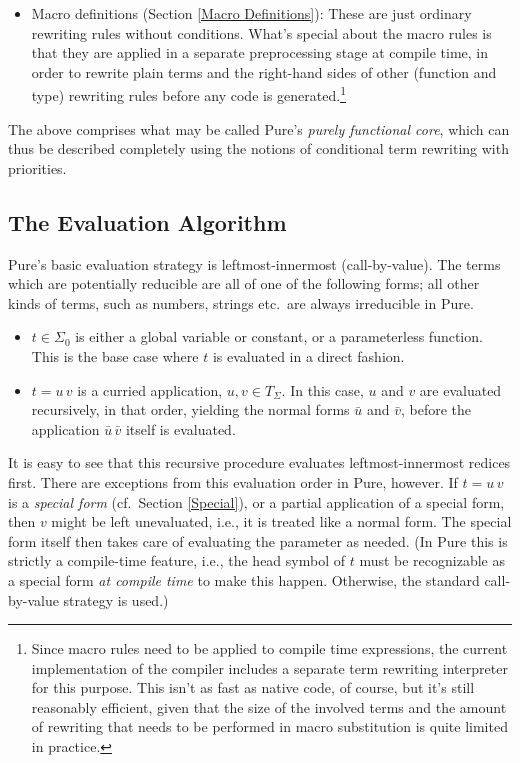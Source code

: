 \documentclass[a4paper,12pt]{article}
\begin{document}
\begin{itemize}
\item Macro definitions (Section \ref{Macro Definitions}): These are just ordinary rewriting rules without conditions. What's special about the macro rules is that they are applied in a separate preprocessing stage at compile time, in order to rewrite plain terms and the right-hand sides of other (function and type) rewriting rules before any code is generated.\footnote{Since macro rules need to be applied to compile time expressions, the current implementation of the compiler includes a separate term rewriting interpreter for this purpose. This isn't as fast as native code, of course, but it's still reasonably efficient, given that the size of the involved terms and the amount of rewriting that needs to be performed in macro substitution is quite limited in practice.}
\end{itemize}

The above comprises what may be called Pure's \emph{purely functional core}, which can thus be described completely using the notions of conditional term rewriting with priorities.

\subsection{The Evaluation Algorithm}

Pure's basic evaluation strategy is leftmost-innermost (call-by-value). The terms which are potentially reducible are all of one of the following forms; all other kinds of terms, such as numbers, strings etc.\ are always irreducible in Pure.

\begin{itemize}
\item $t\in\Sigma_0$ is either a global variable or constant, or a parameterless function. This is the base case where $t$ is evaluated in a direct fashion.
\item $t=u\,v$ is a curried application, $u,v\in T_\Sigma$. In this case, $u$ and $v$ are evaluated recursively, in that order, yielding the normal forms $\bar u$ and $\bar v$, before the application $\bar u\,\bar v$ itself is evaluated.
\end{itemize}

It is easy to see that this recursive procedure evaluates leftmost-innermost redices first. There are exceptions from this evaluation order in Pure, however. If $t=u\,v$ is a \emph{special form} (cf.\ Section \ref{Special}), or a partial application of a special form, then $v$ might be left unevaluated, i.e., it is treated like a normal form. The special form itself then takes care of evaluating the parameter as needed. (In Pure this is strictly a compile-time feature, i.e., the head symbol of $t$ must be recognizable as a special form \emph{at compile time} to make this happen. Otherwise, the standard call-by-value strategy is used.)
\end{document}
